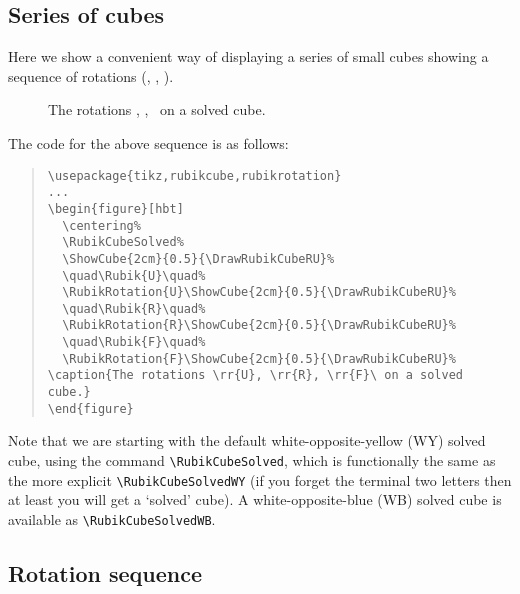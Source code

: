 \documentclass[a4paper]{article}
\begin{document}
\pagebreak
\subsection{Series of cubes}

Here we show a convenient way of displaying a series of small cubes showing 
a sequence of rotations (, , ). 


\begin{figure}[hbt]
\centering
\RubikCubeSolved 
{}%
\quad{}\quad%
%
\quad{}\quad%
%
\quad{}\quad%
%
\caption{The rotations , , \ on a solved cube.} 
\end{figure}

{\noindent}The code for the above sequence is as follows:
\begin{quote}
\begin{verbatim}
\usepackage{tikz,rubikcube,rubikrotation}
...
\begin{figure}[hbt]
  \centering%
  \RubikCubeSolved%
  \ShowCube{2cm}{0.5}{\DrawRubikCubeRU}%
  \quad\Rubik{U}\quad%
  \RubikRotation{U}\ShowCube{2cm}{0.5}{\DrawRubikCubeRU}% 
  \quad\Rubik{R}\quad%
  \RubikRotation{R}\ShowCube{2cm}{0.5}{\DrawRubikCubeRU}%
  \quad\Rubik{F}\quad%
  \RubikRotation{F}\ShowCube{2cm}{0.5}{\DrawRubikCubeRU}%
\caption{The rotations \rr{U}, \rr{R}, \rr{F}\ on a solved cube.} 
\end{figure}
\end{verbatim}
\end{quote}

{\noindent}Note that we are starting with the default white-opposite-yellow (WY) 
solved cube, using the command  \verb!\RubikCubeSolved!, which is functionally  
the same as the more explicit \verb!\RubikCubeSolvedWY! (if you forget the 
terminal two letters then at least you will get a `solved' cube). 
A white-opposite-blue (WB) solved cube is available as \verb!\RubikCubeSolvedWB!.




\pagebreak
\subsection{Rotation sequence}
\end{document}
